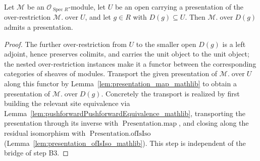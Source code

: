 \begin{lemma}
  \label{lem:presentation_over_basicOpen}
  Let \(\mathcal{M}\) be an \(\mathcal{O}_{\operatorname{Spec} R}\)-module, let \(U\) be an open
  carrying a presentation of the over-restriction \(\mathcal{M}.\operatorname{over} U\), and let
  \(g \in R\) with \(D(g) \subseteq U\). Then \(\mathcal{M}.\operatorname{over} D(g)\) admits a
  presentation.
\end{lemma}
\begin{proof}
  \leanok
  The further over-restriction from \(U\) to the smaller open \(D(g)\) is a left adjoint, hence
  preserves colimits, and carries the unit object to the unit object; the nested over-restriction
  instances make it a functor between the corresponding categories of sheaves of modules. Transport the
  given presentation of \(\mathcal{M}.\operatorname{over} U\) along this functor by
  Lemma~\ref{lem:presentation_map_mathlib} to obtain a presentation of
  \(\mathcal{M}.\operatorname{over} D(g)\). Concretely the transport is realized by first building the
  relevant site equivalence via Lemma~\ref{lem:pushforwardPushforwardEquivalence_mathlib}, transporting
  the presentation through its inverse with \(\operatorname{Presentation.map}\), and closing along the
  residual isomorphism with \(\operatorname{Presentation.ofIsIso}\)
  (Lemma~\ref{lem:presentation_ofIsIso_mathlib}). This step is independent of the bridge of step B3.
\end{proof}

